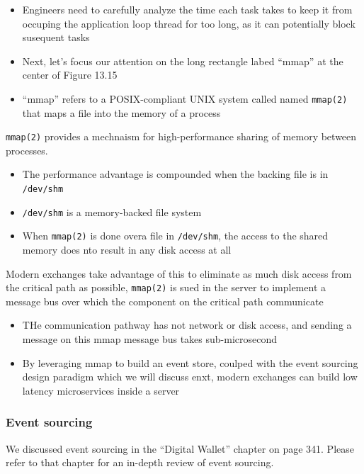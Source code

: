 \documentclass{report}
\theoremstyle{definition}
\let\oldsubsubsection\subsubsection
\renewcommand{\subsubsection}{\oldsubsubsection*}
\begin{document}
\begin{itemize}
\item
Engineers need to carefully analyze the time each task takes to keep it from occuping the application loop thread for too long, as it can potentially block susequent tasks
\item
Next, let's focus our attention on the long rectangle labed ``mmap'' at the center of Figure 13.15
\item
``mmap'' refers to a POSIX-compliant UNIX system called named \lstinline|mmap(2)| that maps a file into the memory of a process
\end{itemize}

\lstinline|mmap(2)| provides a mechnaism for high-performance sharing of memory between processes.

\begin{itemize}
\item
The performance advantage is compounded when the backing file is in \lstinline|/dev/shm|
\item
\lstinline|/dev/shm| is a memory-backed file system
\item
When \lstinline|mmap(2)| is done overa file in \lstinline|/dev/shm|, the access to the shared memory does nto result in any disk access at all
\end{itemize}

Modern exchanges take advantage of this to eliminate as much disk access from the critical path as possible, \lstinline|mmap(2)| is sued in the server to implement a message bus over which the component on the critical path communicate

\begin{itemize}
\item
THe communication pathway has not network or disk access, and sending a message on this mmap message bus takes sub-microsecond
\item
By leveraging mmap to build an event store, coulped with the event sourcing design paradigm which we will discuss enxt, modern exchanges can build low latency microservices inside a server
\end{itemize}

\subsubsection{Event sourcing}

We discussed event sourcing in the ``Digital Wallet'' chapter on page 341. Please refer to that chapter for an in-depth review of event sourcing.
\end{document}
